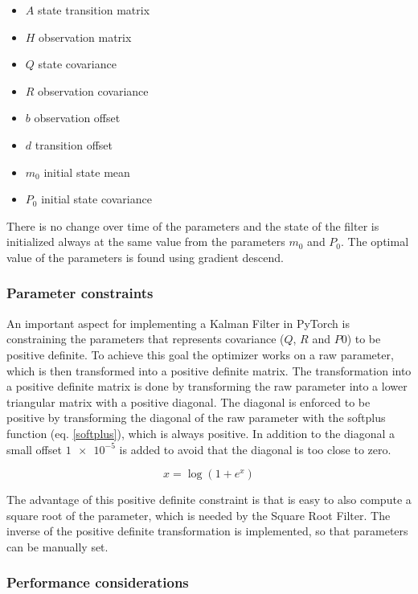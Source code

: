 \documentclass{article}
\let\Oldsubsubsection\subsubsection
\renewcommand{\subsubsection}{\FloatBarrier\Oldsubsubsection}
\begin{document}
\begin{itemize}
    \item $A$ state transition matrix
    \item $H$ observation matrix
    \item $Q$ state covariance
    \item $R$ observation covariance
    \item $b$ observation offset
    \item $d$ transition offset
    \item $m_0$ initial state mean
    \item $P_0$ initial state covariance
\end{itemize}

There is no change over time of the parameters and the state of the filter is initialized always at the same value from the parameters $m_0$ and $P_0$.
The optimal value of the parameters is found using gradient descend.

\subsubsection{Parameter constraints}

An important aspect for implementing a Kalman Filter in PyTorch is constraining the parameters that represents covariance ($Q$, $R$ and $P0$) to be positive definite. To achieve this goal the optimizer works on a raw parameter, which is then transformed into a positive definite matrix.
The transformation into a positive definite matrix is done by transforming the raw parameter into a lower triangular matrix with a positive diagonal. The diagonal is enforced to be positive by transforming the diagonal of the raw parameter with the softplus function (eq. \ref{softplus}), which is always positive. In addition to the diagonal a small offset $\num{1e-5}$ is added to avoid that the diagonal is too close to zero.

\begin{equation}\label{softplus}
    x = \log (1 + e^{x})
\end{equation}

The advantage of this positive definite constraint is that is easy to also compute a square root of the parameter, which is needed by the Square Root Filter.
The inverse of the positive definite transformation is implemented, so that parameters can be manually set.

\subsubsection{Performance considerations} 
\end{document}
